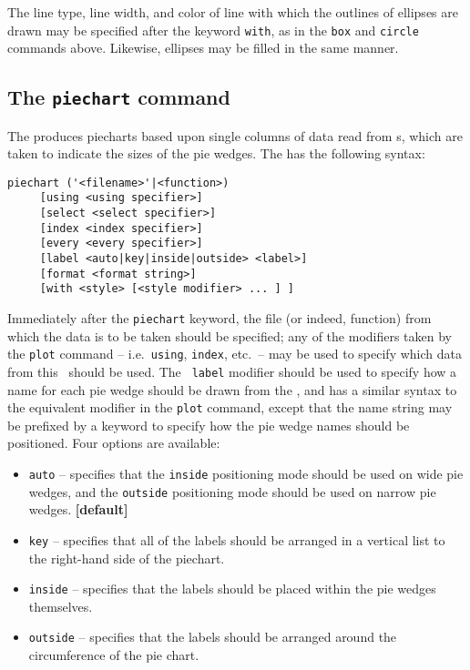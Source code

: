 The line type, line width, and color of line with which the outlines of
ellipses are drawn may be specified after the keyword {\tt with}, as in the
{\tt box} and {\tt circle} commands above. Likewise, ellipses may be filled in
the same manner.


\subsection{The {\tt piechart} command}
\label{sec:piechart}

The  produces piecharts based upon single columns of data
read from \datafile s, which are taken to indicate the sizes of the pie wedges.
The  has the following syntax:
\begin{verbatim}
piechart ('<filename>'|<function>)
     [using <using specifier>]
     [select <select specifier>]
     [index <index specifier>]
     [every <every specifier>]
     [label <auto|key|inside|outside> <label>]
     [format <format string>]
     [with <style> [<style modifier> ... ] ]
\end{verbatim}

Immediately after the {\tt piechart} keyword, the file (or indeed, function)
from which the data is to be taken should be specified; any of the modifiers
taken by the {\tt plot} command -- i.e.\ {\tt using}, {\tt index}, etc.\ -- may
be used to specify which data from this \datafile\ should be used. The {\tt
label} modifier should be used to specify how a name for each pie wedge should
be drawn from the \datafile, and has a similar syntax to the equivalent
modifier in the {\tt plot} command, except that the name string may be
prefixed by a keyword to specify how the pie wedge names should be positioned.
Four options are available:

\noindent
\begin{itemize}
\item {\tt auto} -- specifies that the {\tt inside} positioning mode should be used on wide pie wedges, and the {\tt outside} positioning mode should be used on narrow pie wedges. {\bf [default]}
\item {\tt key} -- specifies that all of the labels should be arranged in a vertical list to the right-hand side of the piechart.
\item {\tt inside} -- specifies that the labels should be placed within the pie wedges themselves.
\item {\tt outside} -- specifies that the labels should be arranged around the circumference of the pie chart.
\end{itemize}

